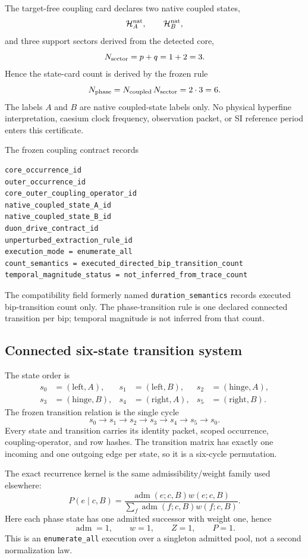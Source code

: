 The target-free coupling card declares two native coupled states,
\[
\mathcal H_A^{\rm nat},\qquad \mathcal H_B^{\rm nat},
\]
and three support sectors derived from the detected core,
\[
N_{\rm sector}=p+q=1+2=3.
\]
Hence the state-card count is derived by the frozen rule
\[
N_{\rm phase}
=
N_{\rm coupled}\,N_{\rm sector}
=
2\cdot3
=
6.
\]
The labels $A$ and $B$ are native coupled-state labels only.  No physical
hyperfine interpretation, caesium clock frequency, observation packet, or SI
reference period enters this certificate.

The frozen coupling contract records
\begin{verbatim}
core_occurrence_id
outer_occurrence_id
core_outer_coupling_operator_id
native_coupled_state_A_id
native_coupled_state_B_id
duon_drive_contract_id
unperturbed_extraction_rule_id
execution_mode = enumerate_all
count_semantics = executed_directed_bip_transition_count
temporal_magnitude_status = not_inferred_from_trace_count
\end{verbatim}
The compatibility field formerly named \texttt{duration\_semantics} records
executed bip-transition count only.  The phase-transition rule is one declared
connected transition per bip; temporal magnitude is not inferred from that count.

\subsection{Connected six-state transition system}

The state order is
\[
\begin{aligned}
s_0&=(\text{left},A),&
 s_1&=(\text{left},B),&
 s_2&=(\text{hinge},A),\\
s_3&=(\text{hinge},B),&
 s_4&=(\text{right},A),&
 s_5&=(\text{right},B).
\end{aligned}
\]
The frozen transition relation is the single cycle
\[
\boxed{
 s_0\longrightarrow s_1\longrightarrow s_2\longrightarrow s_3
 \longrightarrow s_4\longrightarrow s_5\longrightarrow s_0.
}
\]
Every state and transition carries its identity packet, scoped occurrence,
coupling-operator, and row hashes.  The transition matrix has exactly one
incoming and one outgoing edge per state, so it is a six-cycle permutation.

The exact recurrence kernel is the same admissibility/weight family used
elsewhere:
\[
P(e\mid c,B)
=
\frac{\operatorname{adm}(e;c,B)w(e;c,B)}
{\sum_f\operatorname{adm}(f;c,B)w(f;c,B)}.
\]
Here each phase state has one admitted successor with weight one, hence
\[
\operatorname{adm}=1,
\qquad
w=1,
\qquad
Z=1,
\qquad
P=1.
\]
This is an \texttt{enumerate\_all} execution over a singleton admitted pool,
not a second normalization law.

